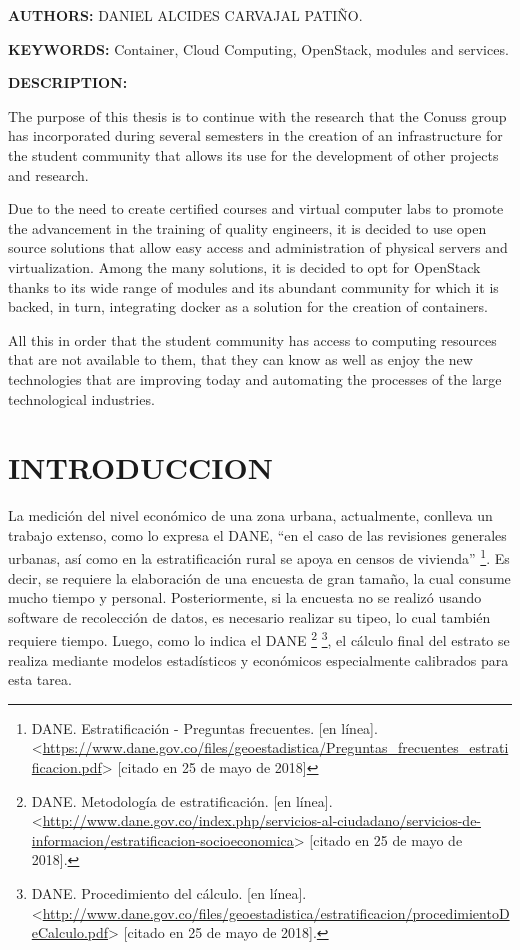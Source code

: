     \textbf{AUTHORS:} DANIEL ALCIDES CARVAJAL PATIÑO.
    
    \textbf{KEYWORDS:} Container, Cloud Computing, OpenStack, modules and services.
    
    \textbf{DESCRIPTION:} 
    
    The purpose of this thesis is to continue with the research that the Conuss group has incorporated during several semesters in the creation of an infrastructure for the student community that allows its use for the development of other projects and research.
    
    Due to the need to create certified courses and virtual computer labs to promote the advancement in the training of quality engineers, it is decided to use open source solutions that allow easy access and administration of physical servers and virtualization. Among the many solutions, it is decided to opt for OpenStack thanks to its wide range of modules and its abundant community for which it is backed, in turn, integrating docker as a solution for the creation of containers.
    
    All this in order that the student community has access to computing resources that are not available to them, that they can know as well as enjoy the new technologies that are improving today and automating the processes of the large technological industries.
    
\newpage\chapter*{INTRODUCCION}

La medición del nivel económico de una zona urbana, actualmente, conlleva un trabajo extenso, como lo expresa el DANE, “en el caso de las revisiones generales urbanas, así como en la estratificación rural se apoya en censos de vivienda” \footnote{DANE. Estratificación - Preguntas frecuentes. [en línea]. <\url{https://www.dane.gov.co/files/geoestadistica/Preguntas_frecuentes_estratificacion.pdf}> [citado en 25 de mayo de 2018]}. Es decir, se requiere la elaboración de una encuesta de gran tamaño, la cual consume mucho tiempo y personal. Posteriormente, si la encuesta no se realizó usando software de recolección de datos, es necesario realizar su tipeo, lo cual también requiere tiempo. Luego, como lo indica el DANE \footnote{DANE. Metodología de estratificación. [en línea]. <\url{http://www.dane.gov.co/index.php/servicios-al-ciudadano/servicios-de-informacion/estratificacion-socioeconomica}> [citado en 25 de mayo de 2018].} \footnote{DANE. Procedimiento del cálculo. [en línea]. <\url{http://www.dane.gov.co/files/geoestadistica/estratificacion/procedimientoDeCalculo.pdf}> [citado en 25 de mayo de 2018].}, el cálculo final del estrato se realiza mediante modelos estadísticos y económicos especialmente calibrados para esta tarea.
    
